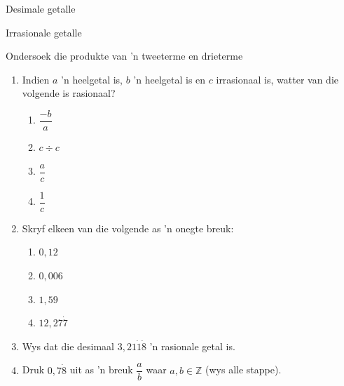 \begin{Aktiwiteit}{Desimale getalle}
\begin{aktiwiteit}{Irrasionale getalle}
\begin{aktiwiteit}{Ondersoek die produkte van 'n tweeterme en drieterme}
\begin{eocexercises}{}
\begin{enumerate}[itemsep=5pt, label=\textbf{\arabic*}. ] 
\item Indien $a$ ’n heelgetal is, $b$ ’n heelgetal is en $c$ irrasionaal is, watter van die volgende is rasionaal?
    \begin{enumerate}[itemsep=5pt, label=\textbf{\alph*}. ] 
    \item $\dfrac{-b}{a}$
    \item $c \div c$
    \item $\dfrac{a}{c}$
    \item $\dfrac{1}{c}$
    \end{enumerate}
\item Skryf elkeen van die volgende as ’n onegte breuk:
    \begin{enumerate}[itemsep=5pt, label=\textbf{\alph*}. ] 
    \item $0,12$
    \item $0,006$
    \item $1,59$
    \item $12,27\dot{7}$
    \end{enumerate}
\item Wys dat die desimaal $3,21\dot{1}\dot{8}$ ’n rasionale getal is.
\item Druk  $0,7\dot{8}$ uit as ’n breuk $\dfrac{a}{b}$ waar $a,b\in \mathbb{Z}$ (wys alle stappe).






\end{enumerate}
\end{eocexercises}
\end{aktiwiteit}
\end{aktiwiteit}
\end{Aktiwiteit}
